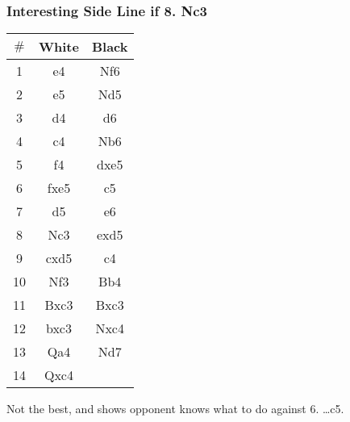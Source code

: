 \documentclass{article}
\newcommand{\smalls}{\par\smallskip}
\begin{document}
        \subsubsection*{Interesting Side Line if 8. Nc3}
        \begin{multicols}{2}
            \showboard
            \smalls
            \begin{tabular}{c|c|c}
                $\#$ & White & Black\\
                \hline
                1 & e4 & Nf6 \\
                2 & e5 & Nd5 \\
                3 & d4 & d6 \\
                4 & c4 & Nb6 \\
                5 & f4 & dxe5 \\
                6 & fxe5 & c5 \\
                7 & d5 & e6 \\
                8 & Nc3 & exd5 \\
                9 & cxd5 & c4 \\
                10 & Nf3 & Bb4 \\
                11 & Bxc3 & Bxc3 \\
                12 & bxc3 & Nxc4 \\
                13 & Qa4 & Nd7 \\
                14 & Qxc4 & \\
            \end{tabular}
        \end{multicols}
        Not the best, and shows opponent knows what to do against 6. \dots c5.
        \smalls
        \newpage
\end{document}

